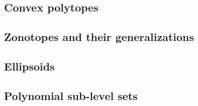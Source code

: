 \subsection{Convex polytopes}


\subsection{Zonotopes and their generalizations}


\subsection{Ellipsoids}


\subsection{Polynomial sub-level sets}


